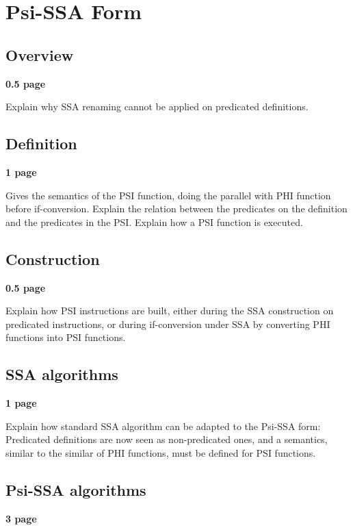\applynumberofpages\chapter{Psi-SSA Form }


\section{Overview}

\textbf{0.5 page}

Explain why SSA renaming cannot be applied on predicated definitions. 

\section{Definition}

\textbf{1 page}

Gives the semantics of the PSI function, doing the parallel with PHI function before if-conversion. Explain the relation between the predicates on the definition and the predicates in the PSI. Explain how a PSI function is executed.

\section{Construction}

\textbf{0.5 page}

Explain how PSI instructions are built, either during the SSA construction on predicated instructions, or during if-conversion under SSA by converting PHI functions into PSI functions.

\section{SSA algorithms}

\textbf{1 page}

Explain how standard SSA algorithm can be adapted to the Psi-SSA form: Predicated definitions are now seen as non-predicated ones, and a semantics, similar to the similar of PHI functions, must be defined for PSI functions.

\section{Psi-SSA algorithms}

\textbf{3 page}

